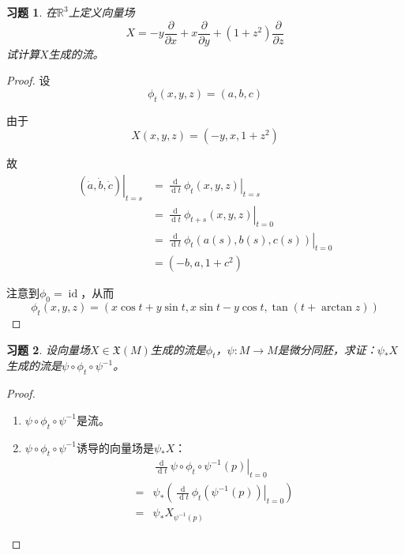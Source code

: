 \documentclass[winfonts,UTF8,c5size,a4paper,fancyhdr,hyperref,titlepage,nocap]{ctexart}
\newtheorem{xiti}{习题}
\theoremstyle{definition}
\theoremstyle{remark}
\numberwithin{equation}{subsection}
\newcommand{\Real}{\mathbb{R}}
\newcommand{\dt}{\frac{\operatorname{d}}{\operatorname{d}t}}
\newcommand{\pfrac}[2]{\frac{\partial{#1}}{\partial{#2}}}
\newcommand{\Xf}[1]{\mathfrak{X}(#1)}
\newcommand{\local}[2]{\left.{#1}\right|_{#2}}%
\newcommand{\localt}[1]{\local{#1}{t=0}}%
\newcommand{\id}{\operatorname{id}}
\begin{document}
\begin{xiti}
  在$\Real^3$上定义向量场
  \begin{equation*}
  X=-y\pfrac{}{x}+x\pfrac{}{y}+(1+z^2)\pfrac{}{z}
  \end{equation*}
  试计算$X$生成的流。
\end{xiti}
\begin{proof}
  设
\begin{equation*}
\phi_t(x,y,z)=(a,b,c)
\end{equation*}

由于
\begin{equation*}
X(x,y,z)=(-y,x,1+z^2)
\end{equation*}

故
\begin{align*}
\local{(\dot{a},\dot{b},\dot{c})}{t=s}&=\local{\dt\phi_t(x,y,z)}{t=s}\\
                                      &=\localt{\dt\phi_{t+s}(x,y,z)}\\
                                      &=\localt{\dt\phi_t(a(s),b(s),c(s))}\\
                                      &=(-b,a,1+c^2)
\end{align*}

注意到$\phi_0=\id$，从而
\begin{equation*}
\phi_t(x,y,z)=(x\cos t+y\sin t,x\sin t-y\cos t,\tan(t+\arctan z))
\end{equation*}
\end{proof}

\begin{xiti}
  设向量场$X\in\Xf{M}$生成的流是$\phi_t$，$\psi\colon M\to M$是微分同胚，求证：$\psi_{\ast}X$生成的流是$\psi\circ\phi_t\circ\psi^{-1}$。
\end{xiti}
\begin{proof}
\begin{enumerate}[1)]
    \setlength{\itemindent}{2ex}
    \item $\psi\circ\phi_t\circ\psi^{-1}$是流。
    \item $\psi\circ\phi_t\circ\psi^{-1}$诱导的向量场是$\psi_{\ast}X$：
  \begin{align*}
     &\localt{\dt\psi\circ\phi_t\circ\psi^{-1}(p)}\\
  =&\psi_{\ast}(\localt{\dt\phi_t(\psi^{-1}(p))})\\
  =&\psi_{\ast}X_{\psi^{-1}(p)}
  \end{align*}
\end{enumerate}
\end{proof}
\end{document}
